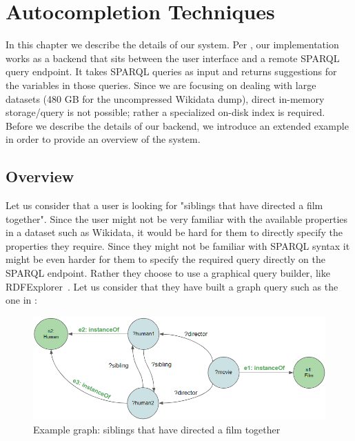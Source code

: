 \chapter{Autocompletion Techniques}
\label{chap:Backend}

In this chapter we describe the details of our system. Per , our implementation works as a backend that sits between the user interface and a remote SPARQL query endpoint. It takes SPARQL queries as input and returns suggestions for the variables in those queries. Since we are focusing on dealing with large datasets (480 GB for the uncompressed Wikidata dump), direct in-memory storage/query is not possible; rather a specialized on-disk index is required.  Before we describe the details of our backend, we introduce an extended example in order to provide an overview of the system.

\section{Overview}

Let us consider that a user is looking for "siblings that have directed a film together". 
Since the user might not be very familiar with the available properties in a dataset such as Wikidata, it would be hard for them to directly specify the properties they require. Since they might not be familiar with SPARQL syntax it might be even harder for them to specify the required query directly on the SPARQL endpoint. Rather they choose to use a graphical query builder, like RDFExplorer~\cite{Vargas2019}. Let us consider that they have built a graph query such as the one in :

\begin{figure}[H]
    \centering
        \includegraphics[width=\linewidth]{imagenes/SiblingsGraph.png}
        \caption{Example graph: siblings that have directed a film together}
        \label{fig:siblingsQueryGraph}
\end{figure}

